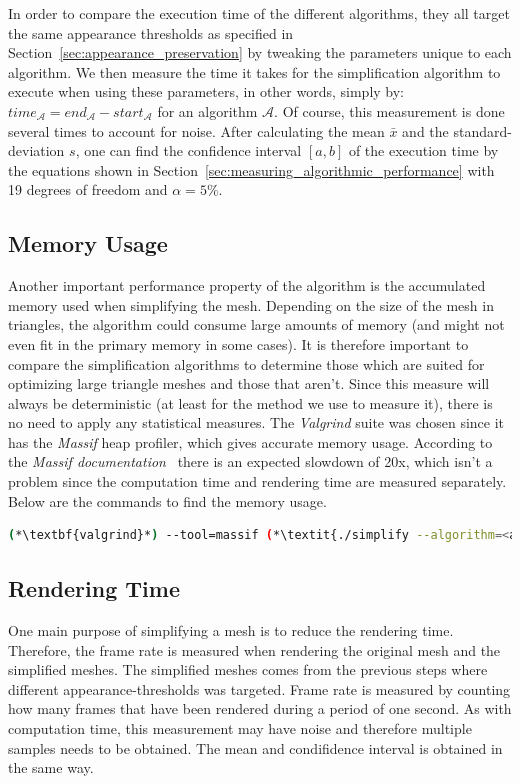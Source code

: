         In order to compare the execution time of the different algorithms, they all target the same appearance thresholds as specified in Section~\ref{sec:appearance_preservation} by tweaking the parameters unique to each algorithm. We then measure the time it takes for the simplification algorithm to execute when using these parameters, in other words, simply by: \(time_\mathcal{A} = end_\mathcal{A} - start_\mathcal{A}\) for an algorithm \(\mathcal{A}\). Of course, this measurement is done several times to account for noise. After calculating the mean \(\bar{x}\) and the standard-deviation \(s\), one can find the confidence interval \([a, b]\) of the execution time by the equations shown in Section~\ref{sec:measuring_algorithmic_performance} with 19 degrees of freedom and \(\alpha = 5 \%\).

        \subsection{Memory Usage} \label{sec:memory_usage}

        Another important performance property of the algorithm is the accumulated memory used when simplifying the mesh. Depending on the size of the mesh in triangles, the algorithm could consume large amounts of memory (and might not even fit in the primary memory in some cases). It is therefore important to compare the simplification algorithms to determine those which are suited for optimizing large triangle meshes and those that aren't. Since this measure will always be deterministic (at least for the method we use to measure it), there is no need to apply any statistical measures. The \emph{Valgrind} suite was chosen since it has the \emph{Massif} heap profiler, which gives accurate memory usage. According to the \emph{Massif documentation}~\cite{valgrind2017manual} there is an expected slowdown of 20x, which isn't a problem since the computation time and rendering time are measured separately. Below are the commands to find the memory usage.

        \begin{lstlisting}[language=bash]
 (*\textbf{valgrind}*) --tool=massif (*\textit{./simplify --algorithm=<algorithm> <input-mesh> <output-mesh>}*)
        \end{lstlisting}

        \subsection{Rendering Time} \label{sec:rendering_time}
        One main purpose of simplifying a mesh is to reduce the rendering time. Therefore, the frame rate is measured when rendering the original mesh and the simplified meshes. The simplified meshes comes from the previous steps where different appearance-thresholds was targeted. Frame rate is measured by counting how many frames that have been rendered during a period of one second. As with computation time, this measurement may have noise and therefore multiple samples needs to be obtained. The mean and condifidence interval is obtained in the same way.


